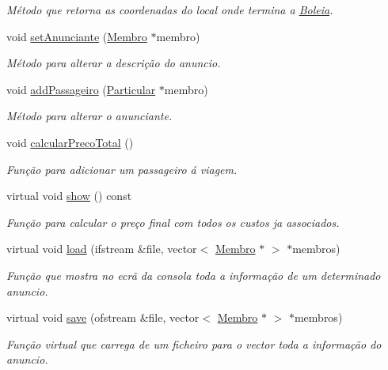 \begin{DoxyCompactItemize}
\begin{DoxyCompactList}\small\item\em Método que retorna as coordenadas do local onde termina a \hyperlink{class_boleia}{Boleia}. \end{DoxyCompactList}\item 
void \hyperlink{class_anuncio_ae0b9bb731a6bf78af45ac2e77ad9e69b}{set\+Anunciante} (\hyperlink{class_membro}{Membro} $\ast$membro)
\begin{DoxyCompactList}\small\item\em Método para alterar a descrição do anuncio. \end{DoxyCompactList}\item 
void \hyperlink{class_anuncio_ae923c9a29c91a103aecd705824f198aa}{add\+Passageiro} (\hyperlink{class_particular}{Particular} $\ast$membro)
\begin{DoxyCompactList}\small\item\em Método para alterar o anunciante. \end{DoxyCompactList}\item 
void \hyperlink{class_anuncio_ac49d84d1a011803f9676f1e47c252125}{calcular\+Preco\+Total} ()
\begin{DoxyCompactList}\small\item\em Função para adicionar um passageiro á viagem. \end{DoxyCompactList}\item 
virtual void \hyperlink{class_anuncio_a71729dba796d57356afe20eff021c2d5}{show} () const 
\begin{DoxyCompactList}\small\item\em Função para calcular o preço final com todos os custos ja associados. \end{DoxyCompactList}\item 
virtual void \hyperlink{class_anuncio_a58f1190bb4a2f1743ee76109be853e31}{load} (ifstream \&file, vector$<$ \hyperlink{class_membro}{Membro} $\ast$ $>$ $\ast$membros)
\begin{DoxyCompactList}\small\item\em Função que mostra no ecrã da consola toda a informação de um determinado anuncio. \end{DoxyCompactList}\item 
virtual void \hyperlink{class_anuncio_a66e74841f18c8c0f95b4f3b66ce77797}{save} (ofstream \&file, vector$<$ \hyperlink{class_membro}{Membro} $\ast$ $>$ $\ast$membros)
\begin{DoxyCompactList}\small\item\em Função virtual que carrega de um ficheiro para o vector toda a informação do anuncio. \end{DoxyCompactList}\item 

\end{DoxyCompactItemize}
